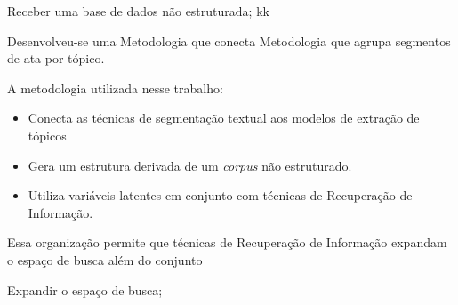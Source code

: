 


Receber uma base de dados não estruturada;
kk


Desenvolveu-se uma
Metodologia que conecta 
Metodologia que agrupa segmentos de ata por tópico.


A metodologia utilizada nesse trabalho: 
\begin{itemize}
	\item Conecta as técnicas de segmentação textual aos modelos de extração de tópicos 
	\item Gera um estrutura derivada de um \textit{corpus} não estruturado.
	\item Utiliza variáveis latentes em conjunto com técnicas de Recuperação de Informação.
\end{itemize}


Essa organização permite
que técnicas de Recuperação de Informação expandam o espaço de busca além do conjunto


Expandir o espaço de busca; 















